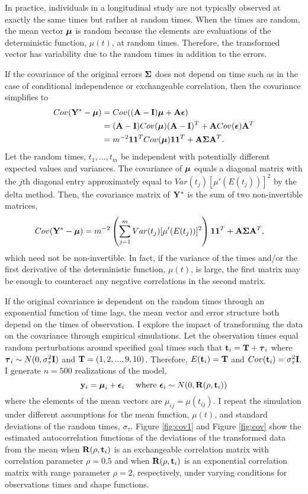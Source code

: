 In practice, individuals in a longitudinal study are not typically observed at exactly the same times but rather at random times. When the times are random, the mean vector $\boldsymbol\mu$ is random because the elements are evaluations of the deterministic function, $\mu(t)$, at random times. Therefore, the transformed vector has variability due to the random times in addition to the errors. 

If the covariance of the original errors $\boldsymbol \Sigma$ does not depend on time such as in the case of conditional independence or exchangeable correlation, then the covariance simplifies to
\begin{align*}
Cov(\mathbf Y^{*} - \boldsymbol\mu) &= Cov((\mathbf A-\mathbf I)\boldsymbol\mu + \mathbf A \boldsymbol\epsilon)\\
&=(\mathbf A-\mathbf I) Cov(\boldsymbol\mu)(\mathbf A-\mathbf I)^{T} + \mathbf A Cov(\boldsymbol\epsilon)\mathbf A^{T}\\
&=m^{-2}\mathbf 1\mathbf 1^{T} Cov(\boldsymbol\mu)\mathbf 1\mathbf 1^{T} + \mathbf A\boldsymbol\Sigma\mathbf A^{T}.
\end{align*}
Let the random times, $t_{1},...,t_{m}$ be independent with potentially different expected values and variances. The covariance of $\boldsymbol\mu$ equals a diagonal matrix with the $j$th diagonal entry approximately equal to $Var(t_{j})[\mu'(E(t_{j}))]^{2}$ by the delta method. Then, the covariance matrix of $\mathbf Y^{*}$ is the sum of two non-invertible matrices,
\begin{align*}
Cov(\mathbf Y^{*} - \boldsymbol\mu) &=m^{-2}\left(\sum^{m}_{j=1}Var(t_{j})[\mu'(E(t_{j}))]^{2}\right) \mathbf 1\mathbf 1^{T}  + \mathbf A\boldsymbol\Sigma\mathbf A^{T},
\end{align*}
which need not be non-invertible. In fact, if the variance of the times and/or the first derivative of the deterministic function, $\mu(t)$, is large, the first matrix may be enough to counteract any negative correlations in the second matrix. 

If the original covariance is dependent on the random times through an exponential function of time lags, the mean vector and error structure both depend on the times of observation. I explore the impact of transforming the data on the covariance through empirical simulations. Let the observation times equal random perturbations around specified goal times such that $\mathbf t_{i} = \mathbf T + \boldsymbol \tau_{i}$ where $\boldsymbol \tau_{i}\sim N(0,\sigma^{2}_{\tau}\mathbf I)$ and $\mathbf T = (1,2,...,9,10)$. Therefore, $E(\mathbf t_{i}) = \mathbf T$ and $Cov(\mathbf t_{i} ) = \sigma^{2}_{\tau}\mathbf I$. I generate $n=500$ realizations of the model,
$$\mathbf y_{i} = \boldsymbol\mu_{i} + \boldsymbol\epsilon_{i}\quad\text{ where }\boldsymbol\epsilon_{i}\sim N(0,\mathbf R(\rho,\mathbf t_{i}))$$
where the elements of the mean vectors are $\mu_{ij}=\mu(t_{ij})$. I repeat the simulation under different assumptions for the mean function, $\mu(t)$, and standard deviations of the random times, $\sigma_{\tau}$. Figure \ref{fig:cov1} and Figure \ref{fig:cov} show the estimated autocorrelation functions of the deviations of the transformed data from the mean when $\mathbf R(\rho,\mathbf t_{i})$ is an exchangeable correlation matrix with correlation parameter $\rho=0.5$ and when  $\mathbf R(\rho,\mathbf t_{i})$ is an exponential correlation matrix with range parameter $\rho=2$, respectively, under varying conditions for observations times and shape functions.

